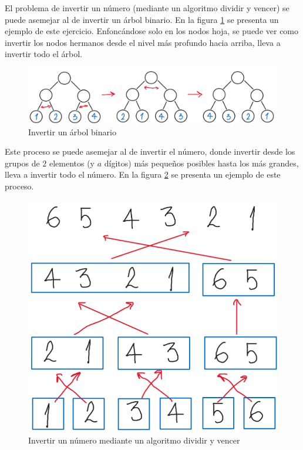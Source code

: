 \documentclass[letter]{article}
\begin{document}
El problema de invertir un número (mediante un algoritmo dividir y vencer) se puede asemejar al de invertir un árbol binario. En la figura \ref{fig:invertir_arbol} se presenta un ejemplo de este ejercicio. Enfoncándose solo en los nodos hoja, se puede ver como invertir los nodos hermanos desde el nivel más profundo hacia arriba, lleva a invertir todo el árbol. \par

\begin{figure}[!ht]
    \centering
    \includegraphics[scale=0.3]{img/fig2.png}
    \vspace{-1em}
    \caption{Invertir un árbol binario}
    \label{fig:invertir_arbol}
\end{figure}

Este proceso se puede asemejar al de invertir el número, donde invertir desde los grupos de $2$ elementos (y $a$ dígitos) más pequeños posibles hasta los más grandes, lleva a invertir todo el número. En la figura \ref{fig:invertir_numero} se presenta un ejemplo de este proceso.

\begin{figure}[!ht]
    \centering
    \includegraphics[scale=0.3]{img/fig3.png}
    \vspace{-1em}
    \caption{Invertir un número mediante un algoritmo dividir y vencer}
    \label{fig:invertir_numero}
\end{figure}
\end{document}
